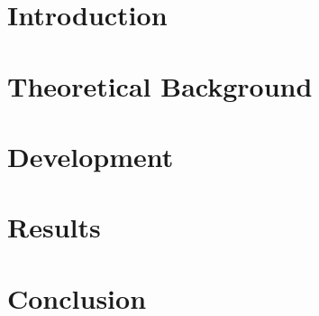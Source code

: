 \documentclass[12pt]{report}
\begin{document}
	\chapter{Introduction}
	\label{chap:Introduction}
	
	
	\chapter{Theoretical Background}
	\label{chap:TheorethicalBackground}
	
	
	\chapter{Development}
	\label{chap:Develop}
	
	
	\chapter{Results}
	\label{chap:Result}
	
	
	\chapter{Conclusion}
	\label{chap:Conclusion}
	
	
	
	
	
	\clearpage
	
	
	\printbibliography
	
	
	
	
\end{document}
